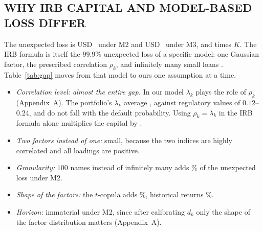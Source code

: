 \subsection{WHY IRB CAPITAL AND MODEL-BASED LOSS DIFFER}
The unexpected loss is USD~ under M2 and USD~ under M3,  and  times $K$. The IRB formula is itself the $99.9\%$ unexpected loss of a specific model: one Gaussian factor, the prescribed correlation $\rho_k$, and infinitely many small loans \citep{Vasicek02,Gordy03}. Table~\ref{tab:gap} moves from that model to ours one assumption at a time.

\begin{table}[tb]
\caption{From the IRB capital to the model-based unexpected loss at $99.9\%$ (reference run), one assumption at a time.}
\label{tab:gap}
\centering
{}
\end{table}

\begin{itemize}
\item \emph{Correlation level: almost the entire gap.} In our model $\lambda_k$ plays the role of $\rho_k$ (Appendix~A). The portfolio's $\lambda_k$ average , against regulatory values of $0.12$--$0.24$, and do not fall with the default probability. Using $\rho_k=\lambda_k$ in the IRB formula alone multiplies the capital by .
\item \emph{Two factors instead of one:} small, because the two indices are highly correlated and all loadings are positive.
\item \emph{Granularity:} $100$ names instead of infinitely many adds \% of the unexpected loss under M2.
\item \emph{Shape of the factors:} the $t$-copula adds \%, historical returns \%.
\item \emph{Horizon:} immaterial under M2, since after calibrating $d_k$ only the shape of the factor distribution matters (Appendix~A).
\end{itemize}

